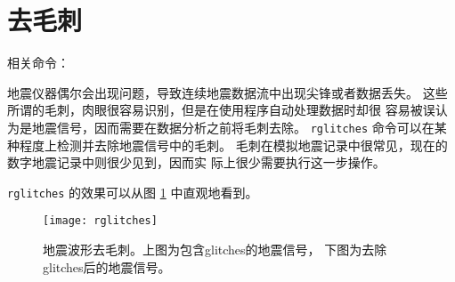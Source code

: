 \section{去毛刺}
相关命令：

地震仪器偶尔会出现问题，导致连续地震数据流中出现尖锋或者数据丢失。
这些所谓的毛刺，肉眼很容易识别，但是在使用程序自动处理数据时却很
容易被误认为是地震信号，因而需要在数据分析之前将毛刺去除。
\texttt{rglitches} 命令可以在某种程度上检测并去除地震信号中的毛刺。
毛刺在模拟地震记录中很常见，现在的数字地震记录中则很少见到，因而实
际上很少需要执行这一步操作。

\texttt{rglitches} 的效果可以从图 \ref{fig:deglitches} 中直观地看到。
\begin{figure}[H]
\centering
\texttt{[image: rglitches]}
\caption[地震波形去毛刺]{地震波形去毛刺。上图为包含glitches的地震信号，
    下图为去除glitches后的地震信号。}
\label{fig:deglitches}
\end{figure}
